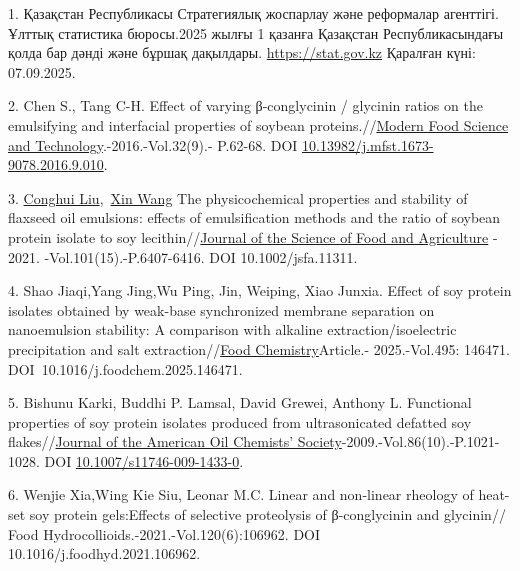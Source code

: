 \begin{refs}
1. Қазақстан Республикасы Стратегиялық жоспарлау және реформалар
агенттігі. Ұлттық статистика бюросы.2025 жылғы 1 қазанға Қазақстан
Республикасындағы қолда бар дәнді және бұршақ дақылдары.
\href{https://stat.gov.kz/search/index.php?q=\%D0\%B4\%D3\%99\%D0\%BD\%D0\%B4\%D1\%96+&s}{https://stat.gov.kz} Қаралған күні: 07.09.2025.

2. Chen S., Tang C-H. Effect of varying β-conglycinin / glycinin ratios
on the emulsifying and interfacial properties of soybean
proteins.//\href{https://www.researchgate.net/journal/Modern-Food-Science-and-Technology-1673-9078?_tp=eyJjb250ZXh0Ijp7ImZpcnN0UGFnZSI6InB1YmxpY2F0aW9uIiwicGFnZSI6InB1YmxpY2F0aW9uIn19}{Modern
Food Science and Technology}.-2016.-Vol.32(9).- P.62-68. DOI
\href{https://doi.org/10.13982/j.mfst.1673-9078.2016.9.010}{10.13982/j.mfst.1673-9078.2016.9.010}.

3. \href{https://scijournals.onlinelibrary.wiley.com/authored-by/Liu/Conghui}{Conghui
Liu},~\href{https://scijournals.onlinelibrary.wiley.com/authored-by/Wang/Xin}{Xin
Wang} The physicochemical properties and stability of flaxseed oil
emulsions: effects of emulsification methods and the ratio of soybean
protein isolate to soy
lecithin//\href{https://www.scopus.com/pages/publications/85106255803?origin=document-preview-flyout}{Journal
of the Science of Food and Agriculture} -
2021. -Vol.101(15).-P.6407-6416. DOI 10.1002/jsfa.11311.

4. Shao Jiaqi,Yang Jing,Wu Ping, Jin, Weiping, Xiao Junxia. Effect of
soy protein isolates obtained by weak-base synchronized membrane
separation on nanoemulsion stability: A comparison with alkaline
extraction/isoelectric precipitation and salt
extraction//\href{https://www.scopus.com/pages/publications/105016785177?origin=document-preview-flyout}{Food
Chemistry}Article.- 2025.-Vol.495: 146471.
DOI~10.1016/j.foodchem.2025.146471.

5. Bishunu Karki, Buddhi P. Lamsal, David Grewei, Anthony L. Functional
properties of soy protein isolates produced from ultrasonicated defatted
soy
flakes//\href{https://www.researchgate.net/journal/Journal-of-the-American-Oil-Chemists-Society-1558-9331?_tp=eyJjb250ZXh0Ijp7ImZpcnN0UGFnZSI6InB1YmxpY2F0aW9uIiwicGFnZSI6InB1YmxpY2F0aW9uIn19}{Journal
of the American Oil Chemists'{}
Society}-2009.-Vol.86(10).-P.1021-1028. DOI
\href{https://doi.org/10.1007/s11746-009-1433-0?urlappend=?utm_source=researchgate.net&utm_medium=article}{10.1007/s11746-009-1433-0}.

6. Wenjie Xia,Wing Kie Siu, Leonar M.C. Linear and non-linear rheology
of heat-set soy protein gels:Effects of selective proteolysis of
β-conglycinin and glycinin// Food
Hydrocollioids.-2021.-Vol.120(6):106962. DOI
10.1016/j.foodhyd.2021.106962.


\end{refs}
